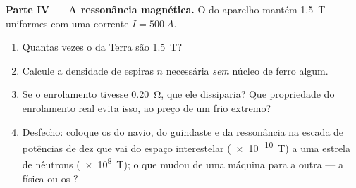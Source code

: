 \begin{problem}
\medskip
\noindent\textbf{Parte IV --- A ressonância magnética.}
O  do aparelho mantém \qty{1.5}{T} uniformes com uma corrente
$I = \qty{500}{A}$.
\begin{enumerate}[resume]
  \item Quantas vezes o  da Terra são \qty{1.5}{T}?
  \item Calcule a densidade de espiras $n$ necessária \emph{sem} núcleo de
        ferro algum.
  \item Se o enrolamento tivesse  \qty{0.20}{\ohm}, que
         ele dissiparia? Que propriedade do enrolamento real
        evita isso, ao preço de um frio extremo?
  \item Desfecho: coloque os  do navio, do guindaste e da
        ressonância na escada de potências de dez que vai do espaço
        interestelar (\qty{e-10}{T}) a uma estrela de nêutrons
        (\qty{e8}{T}); o que mudou de uma máquina para a outra --- a
        física ou os ?
\end{enumerate}
\end{problem}
